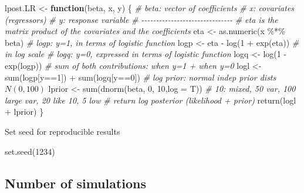 \documentclass[
]{article}
\newenvironment{Shaded}{\begin{snugshade}}{\end{snugshade}}
\newcommand{\AttributeTok}[1]{\textcolor[rgb]{0.77,0.63,0.00}{#1}}
\newcommand{\CommentTok}[1]{\textcolor[rgb]{0.56,0.35,0.01}{\textit{#1}}}
\newcommand{\ControlFlowTok}[1]{\textcolor[rgb]{0.13,0.29,0.53}{\textbf{#1}}}
\newcommand{\DecValTok}[1]{\textcolor[rgb]{0.00,0.00,0.81}{#1}}
\newcommand{\FunctionTok}[1]{\textcolor[rgb]{0.00,0.00,0.00}{#1}}
\newcommand{\NormalTok}[1]{#1}
\newcommand{\OtherTok}[1]{\textcolor[rgb]{0.56,0.35,0.01}{#1}}
\newcommand{\SpecialCharTok}[1]{\textcolor[rgb]{0.00,0.00,0.00}{#1}}
\begin{document}
\begin{Shaded}
\begin{Highlighting}[]
\NormalTok{lpost.LR }\OtherTok{\textless{}{-}} \ControlFlowTok{function}\NormalTok{(beta, x, y) \{}
  \CommentTok{\# beta: vector of coefficients}
  \CommentTok{\# x: covariates (regressors)}
  \CommentTok{\# y: response variable}
  \CommentTok{\# {-}{-}{-}{-}{-}{-}{-}{-}{-}{-}{-}{-}{-}{-}{-}{-}{-}{-}{-}{-}{-}{-}{-}{-}{-}{-}{-}{-}{-}{-}{-}}
  \CommentTok{\# eta is the matrix product of the covariates and the coefficients}
\NormalTok{  eta }\OtherTok{\textless{}{-}} \FunctionTok{as.numeric}\NormalTok{(x }\SpecialCharTok{\%*\%}\NormalTok{ beta)}
  \CommentTok{\# logp: y=1, in terms of logistic function}
\NormalTok{  logp }\OtherTok{\textless{}{-}}\NormalTok{ eta }\SpecialCharTok{{-}} \FunctionTok{log}\NormalTok{(}\DecValTok{1} \SpecialCharTok{+} \FunctionTok{exp}\NormalTok{(eta))  }\CommentTok{\# in log scale}
  \CommentTok{\# logq: y=0, expressed in terms of logistic function}
\NormalTok{  logq }\OtherTok{\textless{}{-}} \FunctionTok{log}\NormalTok{(}\DecValTok{1} \SpecialCharTok{{-}} \FunctionTok{exp}\NormalTok{(logp))}
  \CommentTok{\# sum of both contributions: when y=1 + when y=0}
\NormalTok{  logl }\OtherTok{\textless{}{-}} \FunctionTok{sum}\NormalTok{(logp[y}\SpecialCharTok{==}\DecValTok{1}\NormalTok{]) }\SpecialCharTok{+} \FunctionTok{sum}\NormalTok{(logq[y}\SpecialCharTok{==}\DecValTok{0}\NormalTok{])}
  \CommentTok{\# log prior: normal indep prior dists $N(0, 100)$}
\NormalTok{  lprior }\OtherTok{\textless{}{-}} \FunctionTok{sum}\NormalTok{(}\FunctionTok{dnorm}\NormalTok{(beta, }\DecValTok{0}\NormalTok{, }\DecValTok{10}\NormalTok{,}\AttributeTok{log =}\NormalTok{ T))  }\CommentTok{\# 10: mixed, 50 var, 100 large var, 20 like 10, 5 low}
  \CommentTok{\# return log posterior (likelihood + prior)}
  \FunctionTok{return}\NormalTok{(logl }\SpecialCharTok{+}\NormalTok{ lprior)}
\NormalTok{\}}
\end{Highlighting}
\end{Shaded}

Set seed for reproducible results

\begin{Shaded}
\begin{Highlighting}[]
\FunctionTok{set.seed}\NormalTok{(}\DecValTok{1234}\NormalTok{)}
\end{Highlighting}
\end{Shaded}

\hypertarget{number-of-simulations}{%
\subsection{Number of simulations}\label{number-of-simulations}}
\end{document}
